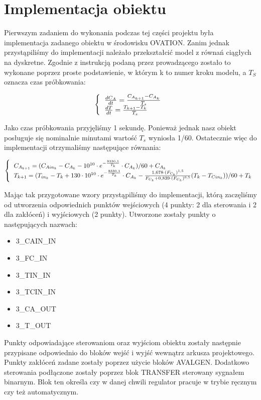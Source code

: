 \chapter{Implementacja obiektu}

Pierwszym zadaniem do wykonania podczas tej części projektu była implementacja zadanego obiektu w środowisku OVATION. Zanim jednak przystąpiliśmy do implementacji należało przekształcić model z równań ciągłych na dyskretne. Zgodnie z instrukcją podaną przez prowadzącego zostało to wykonane poprzez proste podstawienie, w którym k to numer kroku modelu, a $T_S$ oznacza czas próbkowania:

\begin{equation}
\left\{
\begin{tabular}{l}
$\frac{dC_A}{dt} = \frac{C_{A_{k+1}}-C_{A_k}}{T_s}$\\
$\frac{dT}{dt} = \frac{T_{k+1}-T_k}{T_s}$
\end{tabular}
\right.
\end{equation}

Jako czas próbkowania przyjęliśmy 1 sekundę. Ponieważ jednak nasz obiekt posługuje się nominalnie minutami wartość $T_s$ wyniosła 1/60. Ostatecznie więc do implementacji otrzymaliśmy następujące równania:

\begin{equation}
\left\{
\begin{tabular}{l}
$C_{A_{k+1}} = (C_{Ain_k} - C_{A_k} - 10^{10}\cdot e^{-\frac{8330,1}{T_k}}\cdot C_{A_k})/60+C_{A_k}$\\
$T_{k+1} =( T_{in_k} - T_k + 130\cdot 10^{10}\cdot e^{-\frac{8330,1}{T_k}}\cdot C_{A_k}-\frac{1,678\cdot (F_{C_k})^{1,5}}{F_{C_k}+0,839\cdot (F_{C_k})^{0,5}}(T_k-T_{Cin_k}))/60+T_k$
\end{tabular}
\right.
\end{equation}

Mając tak przygotowane wzory przystąpiliśmy do implementacji, którą zaczęliśmy od utworzenia odpowiednich punktów wejściowych (4 punkty: 2 dla sterowania i 2 dla zakłóceń) i wyjściowych (2 punkty). Utworzone zostały punkty o następujących nazwach:
\begin{itemize}
	\item 3\_CAIN\_IN
	\item 3\_FC\_IN
	\item 3\_TIN\_IN
	\item 3\_TCIN\_IN
	\item 3\_CA\_OUT
	\item 3\_T\_OUT
\end{itemize}
Punkty odpowiadające sterowaniom oraz wyjściom obiektu zostały następnie przypisane odpowiednio do bloków wejść i wyjść wewnątrz arkusza projektowego. Punkty zakłóceń zadane zostały poprzez użycie bloków AVALGEN. Dodatkowo sterowania podłączone zostały poprzez blok TRANSFER sterowany sygnałem binarnym. Blok ten określa czy w danej chwili regulator pracuje w trybie ręcznym czy też automatycznym.

